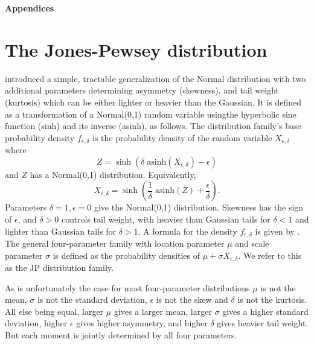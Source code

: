 \documentclass[11pt]{article}
\newcounter{box}
\newcommand{\be}{\begin{equation}}
\newcommand{\ee}{\end{equation}}
\begin{document}
{\newpage 

%



\newpage 
\clearpage 
\setcounter{equation}{0}
\setcounter{figure}{0}
\setcounter{section}{0}
\setcounter{table}{0}
\setcounter{Box}{0}
\renewcommand{\theequation}{S.\arabic{equation}}
\renewcommand{\thetable}{S-\arabic{table}}
\renewcommand{\thefigure}{S-\arabic{figure}}
\renewcommand{\theBox}{S-\arabic{Box}}
\renewcommand{\thesection}{S.\arabic{section}}

\centerline{\Large{\textbf{Appendices}}}

\section{The Jones-Pewsey distribution} 
\citet{jones-pewsey-2009} introduced a simple, tractable generalization of the Normal distribution with two additional parameters determining  
asymmetry (skewness), and tail weight (kurtosis) which can be either lighter or heavier than the Gaussian. It is defined as a transformation
of a Normal(0,1) random variable usingthe hyperbolic sine function (sinh) and its inverse (asinh), as follows. The distribution family's base probability density  
$f_{\epsilon,\delta}$  is the probability density of the random variable $X_{\epsilon,\delta}$ where  
\be
Z = \sinh (\delta \; \mbox{asinh}(X_{\epsilon,\delta}) - \epsilon)
\label{eqn:JP1}
\ee
and $Z$ has a Normal(0,1) distribution.  Equivalently, 
\be
X_{\epsilon,\delta} = \sinh \left( \frac{1}{\delta} \; \mbox{asinh}(Z) + \frac{\epsilon}{\delta}\right).
\label{eqn:JP2}
\ee
Parameters $\delta=1, \epsilon=0$ give the Normal(0,1) distribution. Skewness has the sign of $\epsilon$, and
$\delta > 0$ controls tail weight, with heavier than Gaussian tails for $\delta<1$ and lighter than Gaussian tails for $\delta > 1$. 
A formula for the density $f_{\epsilon,\delta}$ is given by \citet[][eqn. 2]{jones-pewsey-2009}. 
The general four-parameter family with location parameter $\mu$ and scale parameter $\sigma$ is defined as the probability densities 
of $\mu + \sigma X_{\epsilon, \delta}$. We refer to this as the JP distribution family. 

As is unfortunately the case for most four-parameter distributions $\mu$ is not the mean, $\sigma$ is not the standard deviation, $\epsilon$ is not
the skew and $\delta$ is not the kurtosis. All else being equal, larger $\mu$  gives a larger mean, larger $\sigma$ gives a higher
standard deviation, higher $\epsilon$ gives higher asymmetry, and higher $\delta$ gives heavier tail weight.  But each moment is jointly determined 
by all four parameters. 

}
\end{document}
